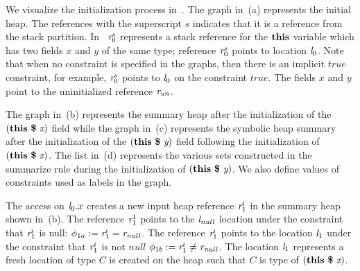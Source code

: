We visualize the initialization process in~. The
graph in~(a) represents the initial heap. The
references with the superscript $s$ indicates that it is a reference from the stack partition.
 In~ $\emph{r}_0^s$ represents a stack
reference for the $\textbf{this}$ variable which has two fields $x$
and $y$ of the same type; reference $\emph{r}_0^s$ points to location
$\emph{l}_0$. Note that when no constraint is specified in the graphs, then
there is an implicit $\mathit{true}$ constraint, for example, $\emph{r}_0^s$
points to $\emph{l}_0$ on the constraint $\mathit{true}$. The fields $x$ and
$y$ point to the uninitialized reference $\emph{r}_\mathit{un}$.


The graph in~(b) represents the summary heap
after the initialization of the $\lp\cfgt{this}\  \cfgt{\$}\ \cfgnt{x}\rp$ field while
the graph in~(c) represents the symbolic heap
summary after the initialization of the $(\textbf{this}\  \textbf{\$}\ \emph{y})$ field
following the initialization of $\lp\cfgt{this}\  \cfgt{\$}\ \cfgnt{x}\rp$. The list
in~(d) represents the various sets constructed in
the summarize rule during the initialization of $(\textbf{this}\  \textbf{\$}\ \emph{y})$. We
also define values of constraints used as labels in the graph.

The access on $\emph{l}_0.x$ creates a new input heap reference $\emph{r}_1^i$ in the
summary heap shown in~(b). The reference $\emph{r}_1^1$
points to the $\emph{l}_\mathit{null}$ location under the constraint that
$\emph{r}_1^i$ is null: $\phi_{1a} := \emph{r}_1^i = \emph{r}_\mathit{null}$. The reference
$\emph{r}_1^i$ points to the location $\emph{l}_1$ under the constraint that $\emph{r}_1^i$
is not $\mathit{null}$ $\phi_{1b} :=\emph{r}_1^i \neq \emph{r}_\mathit{null}$. The
location $\emph{l}_1$ represents a fresh location of type $C$ is created on
the heap such that $C$ is type of $\lp\cfgt{this}\  \cfgt{\$}\ \cfgnt{x}\rp$.

